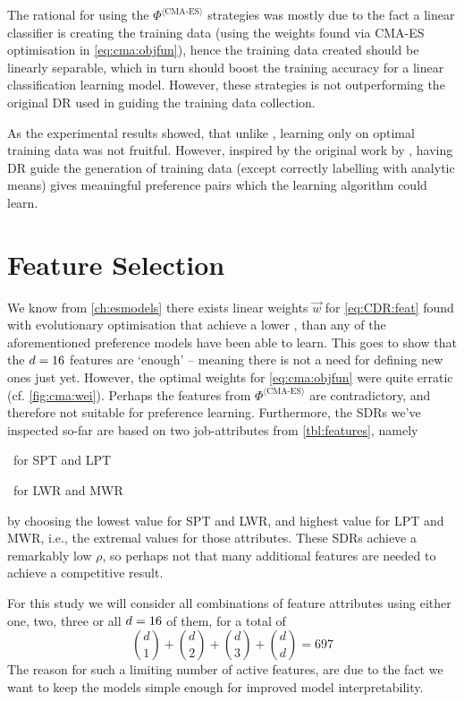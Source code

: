 The rational for using the $\Phi^{\langle \text{CMA-ES} \rangle}$ strategies
was mostly due to the fact a linear classifier is creating the training data 
(using the weights found via CMA-ES optimisation in \cref{eq:cma:objfun}), 
hence the training data created should be linearly separable, which in turn 
should boost the training accuracy for a linear classification learning model. 
However, these strategies is not outperforming the original DR used in guiding 
the training data collection. 

As the experimental results showed, that unlike 
\citep{Siggi10,Malik08,Russell09}, learning only on optimal training 
data was not fruitful. However, inspired by the original work by 
\cite{Siggi05}, having DR guide the generation of training data (except 
correctly labelling with analytic means) gives meaningful preference pairs 
which the learning algorithm could learn. 

\section{Feature Selection}\label{sec:pref:featselect}

We know from \cref{ch:esmodels} there exists linear weights $\vec{w}$ for 
\cref{eq:CDR:feat} found with evolutionary optimisation that achieve a lower 
\namerho, than any of the aforementioned preference models have been able to 
learn. This goes to show that the $d=16$ features are `enough' -- 
meaning there is not a need for defining new ones just yet. 
However, the optimal weights for \cref{eq:cma:objfun} were quite erratic (cf. 
\cref{fig:cma:wei}). 
Perhaps the features from $\Phi^{\langle\text{CMA-ES}\rangle}$ are 
contradictory, and therefore not suitable for preference learning. 
Furthermore, the SDRs we've inspected so-far are based on two job-attributes 
from \cref{tbl:features}, namely
\begin{enumerate*}[after={{,}}]
  \item \phiproc\ for SPT and LPT 
  \item \phijobWrm\ for LWR and MWR 
\end{enumerate*}
by choosing the lowest value for SPT and LWR, and highest value for LPT and 
MWR, i.e., the extremal values for those attributes. 
These SDRs achieve a remarkably low $\rho$, so perhaps not that many additional 
features are needed to achieve a competitive result.

For this study we will consider all combinations of 
feature attributes using either one, two, three or all $d=16$ of 
them, for a total of
\begin{equation}
{d \choose 1}+{d \choose 2}+{d \choose 3}+{d \choose d} = 697
\end{equation}
The reason for such a limiting number of active features, are due to the fact 
we want to keep the models simple enough for improved model interpretability.

